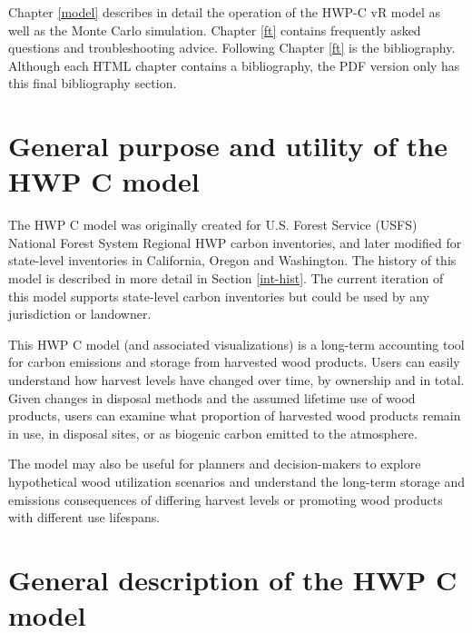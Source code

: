\documentclass[
  openany]{book}
\begin{document}
Chapter \ref{model} describes in detail the operation of the HWP-C vR model as well as the Monte Carlo simulation. Chapter \ref{ft} contains frequently asked questions and troubleshooting advice. Following Chapter \ref{ft} is the bibliography. Although each HTML chapter contains a bibliography, the PDF version only has this final bibliography section.

\hypertarget{int-purp}{%
\section{General purpose and utility of the HWP C model}\label{int-purp}}

The HWP C model was originally created for U.S. Forest Service (USFS) National Forest System Regional HWP carbon inventories, and later modified for state-level inventories in California, Oregon and Washington. The history of this model is described in more detail in Section \ref{int-hist}. The current iteration of this model supports state-level carbon inventories but could be used by any jurisdiction or landowner.

This HWP C model (and associated visualizations) is a long-term accounting tool for carbon emissions and storage from harvested wood products. Users can easily understand how harvest levels have changed over time, by ownership and in total. Given changes in disposal methods and the assumed lifetime use of wood products, users can examine what proportion of harvested wood products remain in use, in disposal sites, or as biogenic carbon emitted to the atmosphere.

The model may also be useful for planners and decision-makers to explore hypothetical wood utilization scenarios and understand the long-term storage and emissions consequences of differing harvest levels or promoting wood products with different use lifespans.

\hypertarget{int-gen}{%
\section{General description of the HWP C model}\label{int-gen}}
\end{document}
